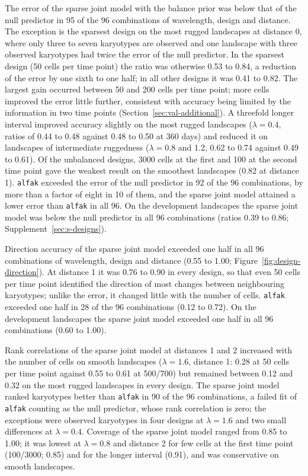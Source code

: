 \documentclass[11pt]{article}
\begin{document}
The error of the sparse joint model with the balance prior was below that of
the null predictor in 95 of the 96 combinations of wavelength, design and
distance. The exception is the sparsest design on the most rugged landscapes
at distance 0, where only three to seven karyotypes are observed and one
landscape with three observed karyotypes had twice the error of the null
predictor. In the sparsest design (50 cells per time point) the ratio was
otherwise 0.53 to 0.84, a reduction of the error by one sixth to one half;
in all other designs it was 0.41 to 0.82. The largest gain occurred between
50 and 200 cells per time point; more cells improved the error little
further, consistent with accuracy being limited by the information in two
time points (Section~\ref{sec:val-additional}). A threefold longer interval
improved accuracy slightly on the most rugged landscapes ($\lambda=0.4$,
ratios of 0.44 to 0.48 against 0.48 to 0.50 at 360 days) and reduced it on
landscapes of intermediate ruggedness ($\lambda=0.8$ and 1.2, 0.62 to 0.74
against 0.49 to 0.61). Of the unbalanced designs, 3000 cells at the first and 100 at the second
time point gave the weakest result on the smoothest landscapes (0.82 at distance
1). \texttt{alfak} exceeded the error of the null
predictor in 92 of the 96 combinations, by more than a factor of eight in 10
of them, and the sparse joint model attained a lower error than
\texttt{alfak} in all 96. On the development landscapes the sparse joint
model was below the null predictor in all 96 combinations (ratios 0.39 to
0.86; Supplement~\ref{sec:s-designs}).

Direction accuracy of the sparse joint model exceeded one half in all 96
combinations of wavelength, design and distance (0.55 to 1.00;
Figure~\ref{fig:design-direction}). At distance 1 it was 0.76 to 0.90 in
every design, so that even 50 cells per time point identified the direction of
most changes between neighbouring karyotypes; unlike the error, it changed
little with the number of cells. \texttt{alfak} exceeded one half in 28 of the
96 combinations (0.12 to 0.72).
On the development landscapes the sparse joint model exceeded one half in all
96 combinations (0.60 to 1.00).

Rank correlations of the sparse joint model at distances 1 and 2 increased
with the number of cells on smooth landscapes ($\lambda=1.6$, distance 1: 0.28 at 50
cells per time point against 0.55 to 0.61 at 500/700) but remained between 0.12
and 0.32 on the most rugged landscapes in every design. The sparse joint model ranked karyotypes better than
\texttt{alfak} in 90 of the 96 combinations, a failed fit of \texttt{alfak}
counting as the null predictor, whose rank correlation is zero; the exceptions were observed karyotypes in four designs at
$\lambda=1.6$ and two small differences at $\lambda=0.4$. Coverage of the
sparse joint model ranged from 0.85 to 1.00; it was lowest at
$\lambda=0.8$ and distance 2 for few cells at the first time point (100/3000;
0.85) and for the longer interval (0.91), and was conservative on smooth
landscapes.
\end{document}
